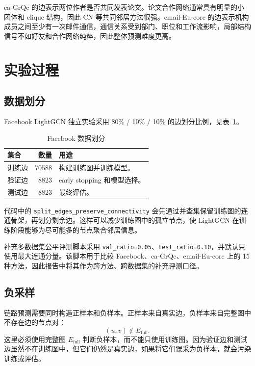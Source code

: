 \documentclass[UTF8,zihao=-4]{ctexart}
\begin{document}
ca-GrQc 的边表示两位作者是否共同发表论文。论文合作网络通常具有明显的小团体和 clique 结构，因此 CN 等共同邻居方法很强。email-Eu-core 的边表示机构成员之间至少有一次邮件通信，通信关系受到部门、职位和工作流影响，局部结构信号不如好友和合作网络纯粹，因此整体预测难度更高。

\section{实验过程}

\subsection{数据划分}

Facebook LightGCN 独立实验采用 80\% / 10\% / 10\% 的边划分比例，见表~\ref{tab:split}。

\begin{table}[H]
\centering
\caption{Facebook 数据划分}
\label{tab:split}
\begin{tabularx}{0.75\textwidth}{lrl}
\toprule
集合 & 数量 & 用途 \\
\midrule
训练边 & 70588 & 构建训练图并训练模型。\\
验证边 & 8823 & early stopping 和模型选择。\\
测试边 & 8823 & 最终评估。\\
\bottomrule
\end{tabularx}
\end{table}

代码中的 \texttt{split\_edges\_preserve\_connectivity} 会先通过并查集保留训练图的连通骨架，再划分剩余边。这样可以减少训练图中的孤立节点，使 LightGCN 在训练阶段能够为尽可能多的节点聚合邻居信息。

补充多数据集公平评测脚本采用 \texttt{val\_ratio=0.05}、\texttt{test\_ratio=0.10}，并默认只使用最大连通分量。该脚本用于比较 Facebook、ca-GrQc、email-Eu-core 上的 15 种方法，因此报告中将其作为跨方法、跨数据集的补充评测口径。

\subsection{负采样}

链路预测需要同时构造正样本和负样本。正样本来自真实边，负样本来自完整图中不存在边的节点对：
\[
(u,v)\notin E_{\text{full}}.
\]
这里必须使用完整图 \(E_{\text{full}}\) 判断负样本，而不能只使用训练图。因为验证边和测试边虽然不在训练图中，但它们仍然是真实边，如果将它们误采为负样本，就会污染训练或评估。
\end{document}
